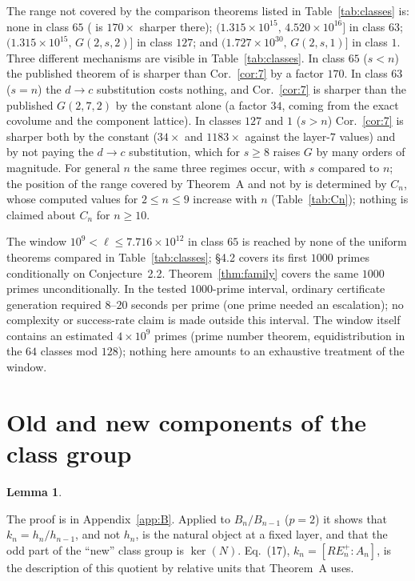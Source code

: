 \documentclass[11pt]{amsart}
\newtheorem{lemma}[theorem]{Lemma}
\theoremstyle{remark}\newtheorem{remark}[theorem]{Remark}
\theoremstyle{definition}\newtheorem{definition}[theorem]{Definition}
\newcommand{\RE}{RE^{+}_n}\newcommand{\ord}{\operatorname{ord}}\newcommand{\hgt}{\operatorname{ht}}
\providecommand{\proofsdir}{../../proofs} %
\begin{document}
The range not covered by the comparison theorems listed in Table~\ref{tab:classes} is: none in class $65$ (\cite{MO16} is $170\times$ sharper there); $(1.315\times10^{15},\,4.520\times10^{16}]$ in class $63$; $(1.315\times10^{15},\,G(2,s,2)]$ in class $127$; and $(1.727\times10^{30},\,G(2,s,1)]$ in class $1$. Three different mechanisms are visible in Table~\ref{tab:classes}. In class $65$ ($s<n$) the published theorem of \cite{MO16} is sharper than Cor.~\ref{cor:7} by a factor $170$. In class $63$ ($s=n$) the $d\to c$ substitution costs nothing, and Cor.~\ref{cor:7} is sharper than the published $G(2,7,2)$ by the constant alone (a factor $34$, coming from the exact covolume and the component lattice). In classes $127$ and $1$ ($s>n$) Cor.~\ref{cor:7} is sharper both by the constant ($34\times$ and $1183\times$ against the layer-$7$ values) and by not paying the $d\to c$ substitution, which for $s\ge8$ raises $G$ by many orders of magnitude. For general $n$ the same three regimes occur, with $s$ compared to $n$; the position of the range covered by Theorem~A and not by \cite{MO16} is determined by $C_n$, whose computed values for $2\le n\le9$ increase with $n$ (Table~\ref{tab:Cn}); nothing is claimed about $C_n$ for $n\ge10$.

The window $10^9<\ell\le7.716\times10^{12}$ in class $65$ is reached by none of the uniform theorems compared in Table~\ref{tab:classes}; \cite{KY} \S4.2 covers its first $1000$ primes conditionally on Conjecture~2.2. Theorem~\ref{thm:family} covers the same $1000$ primes unconditionally. In the tested $1000$-prime interval, ordinary certificate generation required $8$--$20$ seconds per prime (one prime needed an escalation); no complexity or success-rate claim is made outside this interval. The window itself contains an estimated $4\times10^9$ primes (prime number theorem, equidistribution in the $64$ classes mod $128$); nothing here amounts to an exhaustive treatment of the window.

\section{Old and new components of the class group}\label{sec:oldnew}
\begin{lemma}\label{lem:oldnew}

\end{lemma}
The proof is in Appendix~\ref{app:B}. Applied to $B_n/B_{n-1}$ ($p=2$) it shows that $k_n=h_n/h_{n-1}$, and not $h_n$, is the natural object at a fixed layer, and that the odd part of the ``new'' class group is $\ker(N)$. \cite{KY} Eq.~(17), $k_n=[\RE:A_n]$, is the description of this quotient by relative units that Theorem~A uses.
\end{document}
